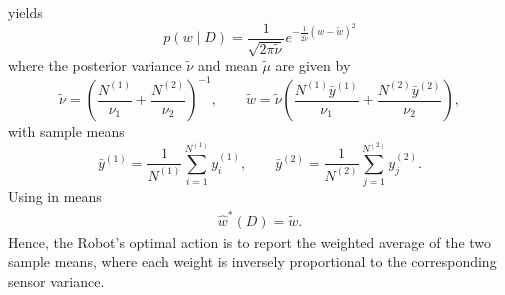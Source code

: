 \begin{example}
	yields
	\begin{equation}
		p(w \mid D) =\frac{1}{\sqrt{2\pi\tilde{\nu}}} e^{-\frac{1}{2\tilde{\nu}}(w - \tilde{w})^2}
		\label{eq:posterior1}
	\end{equation}
	where the posterior variance \(\tilde{\nu}\) and mean \(\tilde{\mu}\) are given by
	\begin{equation}
		\tilde{\nu}
		= \left(\frac{N^{(1)}}{\nu_1} + \frac{N^{(2)}}{\nu_2}\right)^{-1},
		\qquad
		\tilde{w}
		= \tilde{\nu}\left(\frac{N^{(1)}\bar{y}^{(1)}}{\nu_1} + \frac{N^{(2)}\bar{y}^{(2)}}{\nu_2}\right),
	\end{equation}
	with sample means
	\begin{equation}
		\bar{y}^{(1)} = \frac{1}{N^{(1)}}\sum_{i=1}^{N^{(1)}} y_i^{(1)},
		\qquad
		\bar{y}^{(2)} = \frac{1}{N^{(2)}}\sum_{j=1}^{N^{(2)}} y_j^{(2)}.
	\end{equation}
	Using  in  means
	\begin{equation}
		\begin{split}
			\hat{w}^*(D) = \tilde{w}.
		\end{split}
	\end{equation}
	Hence, the Robot’s optimal action is to report the weighted average of the two sample means, where each weight is inversely proportional to the corresponding sensor variance.
\end{example}

